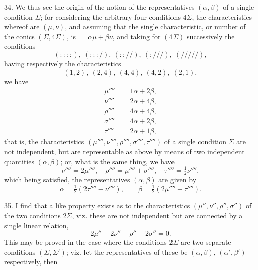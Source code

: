 \documentclass[12pt,a4paper]{article}
\begin{document}
34. We thus see the origin of the notion of the representatives $(\alpha, \beta)$ of a single condition $\Sigma$; for considering the arbitrary four conditions $4\Sigma$, the characteristics whereof are $(\mu, \nu)$, and assuming that the single characteristic, or number of the conics $(\Sigma, 4\Sigma)$, is $=\alpha\mu + \beta\nu$, and taking for $(4\Sigma)$ successively the conditions
\[
(::::),\ (:::/),\ (:://),\ (:///),\ (/////),
\]
having respectively the characteristics
\[
(1, 2),\ (2, 4),\ (4, 4),\ (4, 2),\ (2, 1),
\]
we have
\begin{align*}
\mu'''' &= 1\alpha + 2\beta,\\
\nu'''' &= 2\alpha + 4\beta,\\
\rho'''' &= 4\alpha + 4\beta,\\
\sigma'''' &= 4\alpha + 2\beta,\\
\tau'''' &= 2\alpha + 1\beta,
\end{align*}
that is, the characteristics $(\mu'''', \nu'''', \rho'''', \sigma'''', \tau'''')$ of a single condition $\Sigma$ are not independent, but are representable as above by means of two independent quantities $(\alpha, \beta)$; or, what is the same thing, we have
\[
\nu'''' = 2\mu'''',\quad \rho'''' = \mu'''' + \sigma'''',\quad \tau'''' = \tfrac{1}{2}\nu'''',
\]
which being satisfied, the representatives $(\alpha, \beta)$ are given by
\[
\alpha = \tfrac{1}{2}(2\tau'''' - \nu''''),\qquad \beta = \tfrac{1}{2}(2\mu'''' - \tau'''').
\]

35. I find that a like property exists as to the characteristics $(\mu'', \nu'', \rho'', \sigma'')$ of the two conditions $2\Sigma$, viz. these are not independent but are connected by a single linear relation,
\[
2\mu'' - 2\nu'' + \rho'' - 2\sigma'' = 0.
\]
This may be proved in the case where the conditions $2\Sigma$ are two separate conditions $(\Sigma, \Sigma')$; viz. let the representatives of these be $(\alpha, \beta)$, $(\alpha', \beta')$ respectively, then
\end{document}
